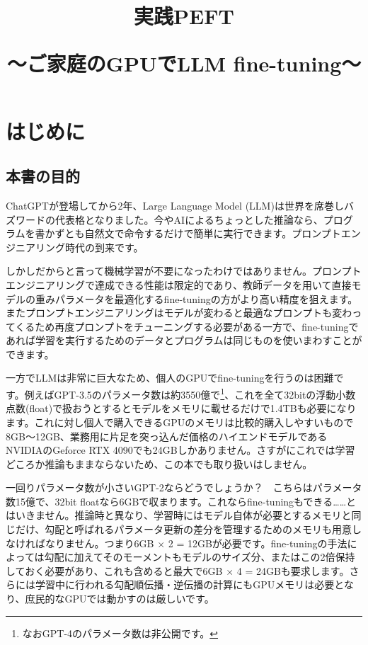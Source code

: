 \documentclass[a5paper,twoside,dvipdfmx]{jsarticle}
\title{実践PEFT

～ご家庭のGPUでLLM fine-tuning～}
\date{}
\begin{document}

\tableofcontents

\newpage

\maketitle

\fontsize{9pt}{16pt}\selectfont

\section{はじめに}

\subsection{本書の目的}

ChatGPTが登場してから2年、Large Language Model (\textsf{LLM})は世界を席巻しバズワードの代表格となりました。今やAIによるちょっとした推論なら、プログラムを書かずとも自然文で命令するだけで簡単に実行できます。プロンプトエンジニアリング時代の到来です。

しかしだからと言って機械学習が不要になったわけではありません。プロンプトエンジニアリングで達成できる性能は限定的であり、教師データを用いて直接モデルの重みパラメータを最適化する\textsf{fine-tuning}の方がより高い精度を狙えます。またプロンプトエンジニアリングはモデルが変わると最適なプロンプトも変わってくるため再度プロンプトをチューニングする必要がある一方で、fine-tuningであれば学習を実行するためのデータとプログラムは同じものを使いまわすことができます。


一方でLLMは非常に巨大なため、個人のGPUでfine-tuningを行うのは困難です。例えばGPT-3.5のパラメータ数は約3550億で\footnote{なおGPT-4のパラメータ数は非公開です。}、これを全て32bitの浮動小数点数(float)で扱おうとするとモデルをメモリに載せるだけで1.4TBも必要になります。これに対し個人で購入できるGPUのメモリは比較的購入しやすいもので8GB～12GB、業務用に片足を突っ込んだ価格のハイエンドモデルであるNVIDIAのGeforce RTX 4090でも24GBしかありません。さすがにこれでは学習どころか推論もままならないため、この本でも取り扱いはしません。

一回りパラメータ数が小さいGPT-2ならどうでしょうか？　こちらはパラメータ数15億で、32bit floatなら6GBで収まります。これならfine-tuningもできる……とはいきません。推論時と異なり、学習時にはモデル自体が必要とするメモリと同じだけ、\textsf{勾配}と呼ばれるパラメータ更新の差分を管理するためのメモリも用意しなければなりません。つまり6GB $\times$ 2 = 12GBが必要です。fine-tuningの手法によっては勾配に加えてそのモーメントもモデルのサイズ分、またはこの2倍保持しておく必要があり、これも含めると最大で6GB $\times$ 4 = 24GBも要求します。さらには学習中に行われる勾配順伝播・逆伝播の計算にもGPUメモリは必要となり、庶民的なGPUでは動かすのは厳しいです。
\end{document}

